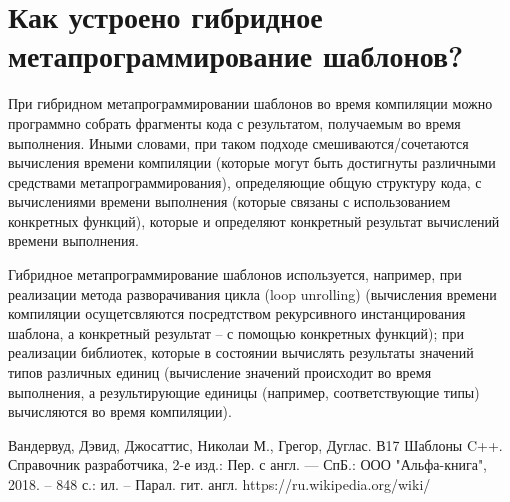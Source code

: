 \documentclass[a4paper,12pt]{article}	%
\begin{document}
\newpage

\section{Как устроено гибридное метапрограммирование шаблонов?}
	
	При гибридном метапрограммировании шаблонов во время компиляции можно программно собрать фрагменты кода с результатом, получаемым во время выполнения. Иными словами, при таком подходе смешиваются/сочетаются вычисления времени компиляции (которые могут быть достигнуты различными средствами метапрограммирования), определяющие общую структуру кода, с вычислениями времени выполнения (которые связаны с использованием конкретных функций), которые и определяют конкретный результат вычислений времени выполнения.
	
	Гибридное метапрограммирование шаблонов используется, например, при реализации метода разворачивания цикла (loop unrolling) (вычисления времени компиляции осущетсвляются посредтством рекурсивного инстанцирования шаблона, а конкретный результат -- с помощью конкретных функций); при реализации библиотек, которые в состоянии вычислять результаты значений типов различных единиц (вычисление значений происходит во время выполнения, а результирующие единицы (например, соответствующие типы) вычисляются во время компиляции).
	
\newpage


 
	\begin{thebibliography}{}
	
		 Вандервуд, Дэвид, Джосаттис, Николаи М., Грегор, Дуглас. В17 Шаблоны C++. Справочник разработчика, 2-е изд.: Пер. с англ. — СпБ.: ООО "Альфа-книга", 2018. -- 848 с.: ил. -- Парал. гит. англ.
		 https://ru.wikipedia.org/wiki/
		
	\end{thebibliography}
\end{document}
